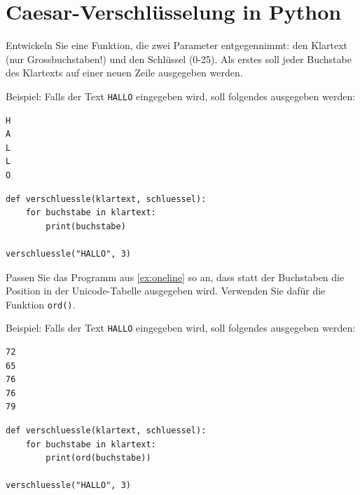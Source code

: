 \newpage
\section{Caesar-Verschlüsselung in Python}
\begin{myexercise}\label{ex:oneline}
    Entwickeln Sie eine Funktion, die zwei Parameter entgegennimmt: den Klartext (nur Grossbuchstaben!) und den Schlüssel (0-25). Als erstes soll jeder Buchstabe des Klartexts auf einer neuen Zeile ausgegeben werden.

    Beispiel: Falls der Text \texttt{HALLO} eingegeben wird, soll folgendes ausgegeben werden:
    \begin{lstlisting}[language=bash]
H
A
L
L
O
\end{lstlisting}
    \begin{myanswer}
        \begin{lstlisting}
def verschluessle(klartext, schluessel):
    for buchstabe in klartext:
        print(buchstabe)

verschluessle("HALLO", 3)
\end{lstlisting}
    \end{myanswer}
\end{myexercise}

\begin{myexercise}\label{ex:oneline-ascii}
    Passen Sie das Programm aus \cref{ex:oneline} so an, dass statt der Buchstaben die Position in der Unicode-Tabelle ausgegeben wird. Verwenden Sie dafür die Funktion \lstinline|ord()|.

    Beispiel: Falls der Text \texttt{HALLO} eingegeben wird, soll folgendes ausgegeben werden:
    \begin{lstlisting}[language=bash]
72
65
76
76
79
\end{lstlisting}
    \begin{myanswer}
        \begin{lstlisting}
def verschluessle(klartext, schluessel):
    for buchstabe in klartext:
        print(ord(buchstabe))

verschluessle("HALLO", 3)
\end{lstlisting}
    \end{myanswer}
\end{myexercise}


